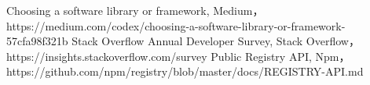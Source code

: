 \documentclass[main]{subfiles}
\begin{document}
\begin{thebibliography}{9}\setlength{\itemsep}{-2pt}
 Choosing a software library or framework, Medium，https://medium.com/codex/choosing-a-software-library-or-framework-57cfa98f321b
 Stack Overflow Annual Developer Survey, Stack Overflow，https://insights.stackoverflow.com/survey
 Public Registry API, Npm，https://github.com/npm/registry/blob/master/docs/REGISTRY-API.md
\end{thebibliography}
\end{document}
